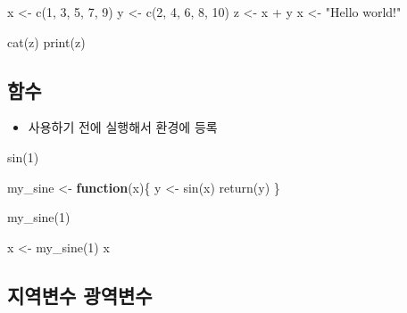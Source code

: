 \documentclass[
]{book}
\newenvironment{Shaded}{\begin{snugshade}}{\end{snugshade}}
\newcommand{\ControlFlowTok}[1]{\textcolor[rgb]{0.13,0.29,0.53}{\textbf{#1}}}
\newcommand{\DecValTok}[1]{\textcolor[rgb]{0.00,0.00,0.81}{#1}}
\newcommand{\FunctionTok}[1]{\textcolor[rgb]{0.00,0.00,0.00}{#1}}
\newcommand{\NormalTok}[1]{#1}
\newcommand{\OtherTok}[1]{\textcolor[rgb]{0.56,0.35,0.01}{#1}}
\newcommand{\SpecialCharTok}[1]{\textcolor[rgb]{0.00,0.00,0.00}{#1}}
\newcommand{\StringTok}[1]{\textcolor[rgb]{0.31,0.60,0.02}{#1}}
\providecommand{\tightlist}{%
  \setlength{\itemsep}{0pt}\setlength{\parskip}{0pt}}
\begin{document}
\begin{Shaded}
\begin{Highlighting}[]
\NormalTok{x }\OtherTok{\textless{}{-}} \FunctionTok{c}\NormalTok{(}\DecValTok{1}\NormalTok{, }\DecValTok{3}\NormalTok{, }\DecValTok{5}\NormalTok{, }\DecValTok{7}\NormalTok{, }\DecValTok{9}\NormalTok{)}
\NormalTok{y }\OtherTok{\textless{}{-}} \FunctionTok{c}\NormalTok{(}\DecValTok{2}\NormalTok{, }\DecValTok{4}\NormalTok{, }\DecValTok{6}\NormalTok{, }\DecValTok{8}\NormalTok{, }\DecValTok{10}\NormalTok{)}
\NormalTok{z }\OtherTok{\textless{}{-}}\NormalTok{ x }\SpecialCharTok{+}\NormalTok{ y}
\NormalTok{x }\OtherTok{\textless{}{-}} \StringTok{"Hello world!"}

\FunctionTok{cat}\NormalTok{(z)}
\FunctionTok{print}\NormalTok{(z)}
\end{Highlighting}
\end{Shaded}

\hypertarget{uxd568uxc218}{%
\subsection{함수}\label{uxd568uxc218}}

\begin{itemize}
\tightlist
\item
  사용하기 전에 실행해서 환경에 등록
\end{itemize}

\begin{Shaded}
\begin{Highlighting}[]
\FunctionTok{sin}\NormalTok{(}\DecValTok{1}\NormalTok{)}

\NormalTok{my\_sine }\OtherTok{\textless{}{-}} \ControlFlowTok{function}\NormalTok{(x)\{}
\NormalTok{    y }\OtherTok{\textless{}{-}} \FunctionTok{sin}\NormalTok{(x)}
    \FunctionTok{return}\NormalTok{(y)}
\NormalTok{\}}

\FunctionTok{my\_sine}\NormalTok{(}\DecValTok{1}\NormalTok{)}

\NormalTok{x }\OtherTok{\textless{}{-}} \FunctionTok{my\_sine}\NormalTok{(}\DecValTok{1}\NormalTok{)}
\NormalTok{x}
\end{Highlighting}
\end{Shaded}

\hypertarget{uxc9c0uxc5eduxbcc0uxc218-uxad11uxc5eduxbcc0uxc218}{%
\subsection{지역변수 광역변수}\label{uxc9c0uxc5eduxbcc0uxc218-uxad11uxc5eduxbcc0uxc218}}
\end{document}
